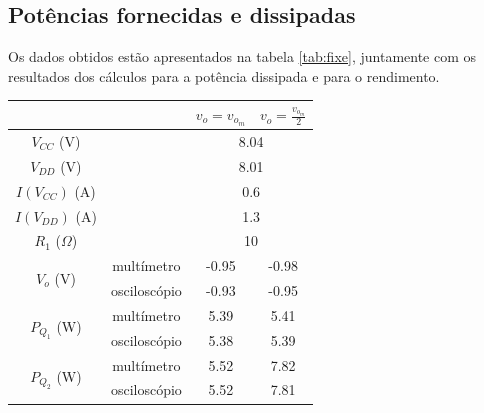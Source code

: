 \documentclass[%
  reprint,
  nofootinbib,
  amsmath,amssymb,
  aps,
  10pt,
  a4paper
]{revtex4-1}
\begin{document}
\subsection{Potências fornecidas e dissipadas}
Os dados obtidos estão apresentados na tabela \ref{tab:fixe}, juntamente com os resultados dos cálculos para a potência dissipada e para o rendimento.
\begin{table}[h]
\begin{tabular}{|cc|c|c|}
                                                             & \multicolumn{1}{l|}{} & $v_o=v_{o_m}$ & $v_o=\frac{v_{o_m}}{2}$ \\ \hline
$V_{CC}$ (V)                                                 & \multicolumn{1}{l|}{} & \multicolumn{2}{c|}{8.04}               \\ \hline
$V_{DD}$ (V)                                                 & \multicolumn{1}{l|}{} & \multicolumn{2}{c|}{8.01}               \\ \hline
$I(V_{CC})$ (A)                                              & \multicolumn{1}{l|}{} & \multicolumn{2}{c|}{0.6}                \\ \hline
$I(V_{DD})$ (A)                                              & \multicolumn{1}{l|}{} & \multicolumn{2}{c|}{1.3}                \\ \hline
$R_1$ ($\Omega$)                                             &                       & \multicolumn{2}{c|}{10}                 \\ \hline
\multicolumn{1}{|c|}{\multirow{2}{*}{$V_o$ (V)}}             & multímetro            & -0.95         & -0.98                   \\ \cline{2-4} 
\multicolumn{1}{|c|}{}                                       & osciloscópio          & -0.93         & -0.95                   \\ \hline
\multicolumn{1}{|c|}{\multirow{2}{*}{$P_{Q_1}$ (W)}}         & multímetro            & 5.39          & 5.41                    \\ \cline{2-4} 
\multicolumn{1}{|c|}{}                                       & osciloscópio          & 5.38          & 5.39                    \\ \hline
\multicolumn{1}{|c|}{\multirow{2}{*}{$P_{Q_2}$ (W)}}         & multímetro            & 5.52          & 7.82                    \\ \cline{2-4} 
\multicolumn{1}{|c|}{}                                       & osciloscópio          & 5.52          & 7.81                    \\ \hline

\end{tabular}
\end{table}
\end{document}

